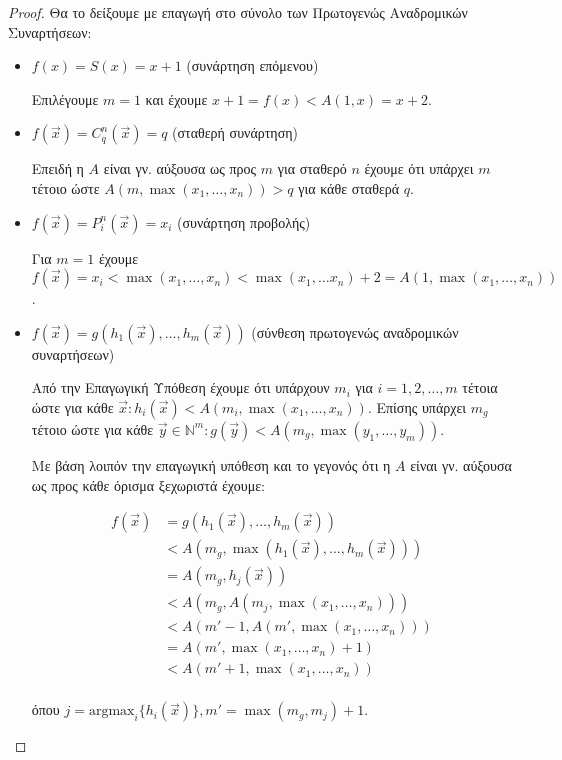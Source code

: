 \documentclass[a4paper, oneside, 11pt]{article}
\theoremstyle{definition}
\newcommand{\ora}{\vec}
\begin{document}
\begin{proof}
Θα το δείξουμε με επαγωγή στο σύνολο των Πρωτογενώς Αναδρομικών Συναρτήσεων:

\begin{itemize}
\item $f(x) = S(x) = x+1$ (συνάρτηση επόμενου)

Επιλέγουμε $m = 1$ και έχουμε $x+1 = f(x) < A(1, x) = x+2$.

\item $f(\ora{x}) = C_q^n(\ora{x}) = q$ (σταθερή συνάρτηση)

Επειδή η $A$ είναι γν. αύξουσα ως προς $m$ για σταθερό $n$ έχουμε ότι υπάρχει
$m$ τέτοιο ώστε $A(m, \max(x_1, \ldots, x_n)) > q$ για κάθε σταθερά $q$.

\item $f(\ora{x}) = P_i^n(\ora{x}) = x_i$ (συνάρτηση προβολής)

Για $m=1$ έχουμε $f(\ora{x}) = x_i < \max(x_1, \ldots, x_n) < \max(x_1, \ldots
x_n) + 2 = A(1, \max(x_1, \ldots, x_n))$.

\item $f(\ora{x}) = g(h_1(\ora{x}), \ldots, h_m(\ora{x}))$ (σύνθεση πρωτογενώς
αναδρομικών συναρτήσεων)

Από την Επαγωγική Υπόθεση έχουμε ότι υπάρχουν $m_i$ για $i = 1, 2, \ldots, m$
τέτοια ώστε για κάθε $\ora{x}: h_i(\ora{x}) < A(m_i, \max(x_1, \ldots, x_n))$.
Επίσης υπάρχει $m_g$ τέτοιο ώστε για κάθε $\ora{y} \in \mathbb{N}^m: g(\ora{y})
< A(m_g, \max(y_1, \ldots, y_m))$.

Με βάση λοιπόν την επαγωγική υπόθεση και το γεγονός ότι η $A$ είναι γν. αύξουσα
ως προς κάθε όρισμα ξεχωριστά έχουμε:

\begin{align*}
   f(\ora{x}) &= g(h_1(\ora{x}), \ldots, h_m(\ora{x}))\\
              &< A(m_g, \max(h_1(\ora{x}), \ldots, h_m(\ora{x})))\\
              &= A(m_g, h_j(\ora{x}))\\
              &< A(m_g, A(m_j, \max(x_1, \ldots, x_n)))\\
              &< A(m'-1, A(m', \max(x_1, \ldots, x_n)))\\
              &= A(m', \max(x_1, \ldots, x_n)+1)\\
              &< A(m'+1, \max(x_1, \ldots, x_n))\\
\end{align*}

όπου $j = \text{argmax}_i \{ h_i(\ora{x}) \}, m' = \max(m_g, m_j) + 1$.


\end{itemize}
\end{proof}
\end{document}
